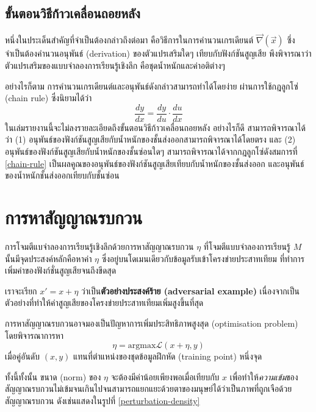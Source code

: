 \documentclass{cpereport}
\begin{document}
\subsection{ขั้นตอนวิธีก้าวเคลื่อนถอยหลัง}

หนึ่งในประเด็นสำคัญที่จำเป็นต้องกล่าวถึงต่อมา คือวิธีการในการคำนวนเกรเดียนต์ $\vec{\nabla}(\vec{x})$ ซึ่งจำเป็นต้องคำนวนอนุพันธ์ (derivation) ของตัวแปรเสริมใดๆ เทียบกับฟังก์ชันสูญเสีย พึงพิจารณาว่าตัวแปรเสริมของแบบจำลองการเรียนรู้เชิงลึก คือชุดน้ำหนักและค่าอติต่างๆ

อย่างไรก็ตาม การคำนวนเกรเดียนต์และอนุพันธ์ดังกล่าวสามารถทำได้โดยง่าย ผ่านการใช้กฎลูกโซ่ (chain rule) ซึ่งนิยามได้ว่า
\begin{equation}
    \frac{dy}{dx} = \frac{dy}{du} \cdot \frac{du}{dx}
    \label{chain-rule}
\end{equation}
ในเล่มรายงานนี้จะไม่ลงรายละเอียดถึงขั้นตอนวิธีก้าวเคลื่อนถอยหลัง อย่างไรก็ดี สามารถพิจารณาได้ว่า (1) อนุพันธ์ของฟังก์ชันสูญเสียกับน้ำหนักของชั้นส่งออกสามารถพิจารณาได้โดยตรง และ (2) อนุพันธ์ของฟังก์ชันสูญเสียกับน้ำหนักของชั้นซ่อนใดๆ สามารถพิจารณาได้จากกฎลูกโซ่ดังสมการที่ \ref{chain-rule} เป็นผลคูณของอนุพันธ์ของฟังก์ชันสูญเสียเทียบกับน้ำหนักของชั้นส่งออก และอนุพันธ์ของน้ำหนักชั้นส่งออกเทียบกับชั้นซ่อน

\section{การหาสัญญาณรบกวน}

การโจมตีแบจำลองการเรียนรู้เชิงลึกด้วยการหาสัญญาณรบกวน $\eta$ ที่โจมตีแบบจำลองการเรียนรู้ $M$ นั้นมีจุดประสงค์หลักคือหาค่า $\eta$ ซึ่งอยู่บนโดเมนเดียวกับข้อมูลรับเข้าโครงข่ายประสาทเทียม ที่ทำการเพิ่มค่าของฟังก์ชั่นสูญเสียจนถึงขีดสุด

เราจะเรียก $x' = x+\eta$ ว่าเป็น\textbf{ตัวอย่างประสงค์ร้าย (adversarial example)} เนื่องจากเป็นตัวอย่างที่ทำให้ค่าสูญเสียของโครงข่ายประสาทเทียมเพิ่มสูงขึ้นที่สุด

การหาสัญญาณรบกวนอาจมองเป็นปัญหาการเพิ่มประสิทธิภาพสูงสุด (optimisation problem) โดยพิจารณาการหา
\begin{equation}
    \eta = \mathrm{argmax}\mathscr{L}\left(x+\eta, y\right)
\end{equation}
เมื่อคู่อันดับ $(x,y)$ แทนที่ตำแหน่งของชุดข้อมูลฝึกหัด (training point) หนึ่งจุด

ทั้งนี้ทั้งนั้น ขนาด (norm) ของ $\eta$ จะต้องมีค่าน้อยเพียงพอเมื่อเทียบกับ $x$ เพื่อทำให้\textit{ความเข้ม}ของสัญญาณรบกวนไม่เข้มจนเกินไปจนสามารถแยกแยะด้วยตาของมนุษย์ได้ว่าเป็นภาพที่ถูกเจือด้วยสัญญาณรบกวน ดังเช่นแสดงในรูปที่ \ref{perturbation-density}
\end{document}
